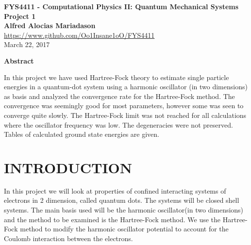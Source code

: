 \documentclass[a4paper, hidelinks, 10pt]{article}
\newcommand{\mdate}{March 22, 2017}
\newcommand{\mtitle}{FYS4411}
\newcommand{\mauthor}{Alfred Alocias Mariadason}
\newcommand{\massignn}{Project 1}
\let\oldsection\section
\renewcommand{\section}[1]{\centering \oldsection{{#1}} \justifying}
\begin{document}
\thispagestyle{empty}
\begin{center} \vspace{1cm}
    \textbf{\Large{\mtitle\hspace{0.01pt} - Computational Physics II: Quantum
    Mechanical Systems}}\\ \vspace{0.5cm}
    \textbf{\large{\massignn}}\\ \vspace{1cm}
    \textbf{\large{\mauthor}}\\ \vspace{0.1cm}
    \large{\url{https://www.github.com/Oo1Insane1oO/FYS4411}} \\ \vspace{0.5cm}
    \Large{\mdate}\\ \vfill
\end{center}

\clearpage
\setcounter{page}{1}

\begin{center}
    \textbf{Abstract} \\
\end{center}
    In this project we have used Hartree-Fock theory to estimate single
    particle energies in a quantum-dot system using a harmonic oscillator (in
    two dimensions) as basis and analyzed the convergence rate for the
    Hartree-Fock method. The convergence was seemingly good for most
    parameters, however some was seen to converge quite slowly. The
    Hartree-Fock limit was not reached for all calculations where the
    oscillator frequency was low. The degeneracies were not preserved. Tables
    of calculated ground state energies are given. \justify

\section{INTRODUCTION}
\label{sec:introduction}
    In this project we will look at properties of confined interacting systems
    of electrons in 2 dimension, called quantum dots. The systems will be
    closed shell systems. The main basis used will be the harmonic
    oscillator(in two dimensions) and the method to be examined is the
    Hartree-Fock method. We use the Hartree-Fock method to modify the harmonic
    oscillator potential to account for the Coulomb interaction between the
    electrons. \\
\end{document}
